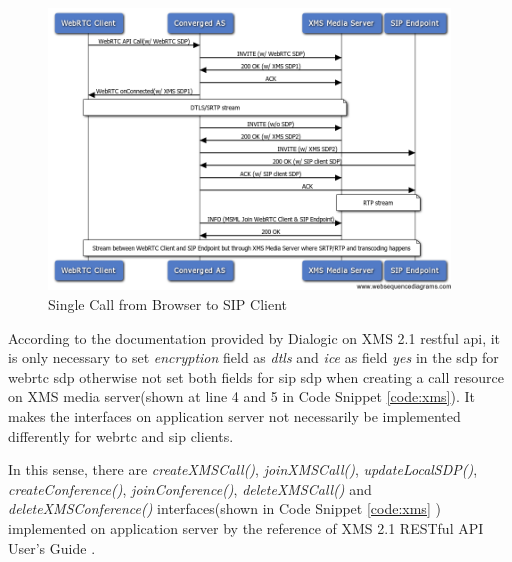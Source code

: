 \begin{figure}
	\centering
    	\includegraphics[width=0.95\textwidth,natwidth=610,natheight=642]{figs/chrome2xms.png}
  	\caption{Single Call from Browser to SIP Client}
  	\label{fig:chrome2xms}
\end{figure}

\par According to the documentation provided by Dialogic on XMS 2.1 \gls{rest}ful \gls{api}\cite{doc:xms_webapi}, it is only necessary to set \textit{encryption} field as \textit{dtls} and \textit{ice} as field \textit{yes} in the \gls{sdp} for \gls{webrtc} \gls{sdp} otherwise not set both fields for \gls{sip} \gls{sdp} when creating a call resource on XMS media server(shown at line 4 and 5 in Code Snippet \ref{code:xms}). It makes the interfaces on application server not necessarily be implemented differently for \gls{webrtc} and \gls{sip} clients.

\par In this sense, there are \textit{createXMSCall()}, \textit{joinXMSCall()}, \textit{updateLocalSDP()}, \textit{createConference()}, \textit{joinConference()}, \textit{deleteXMSCall()} and \textit{deleteXMSConference()} interfaces(shown in Code Snippet \ref{code:xms} ) implemented on application server by the reference of XMS 2.1 RESTful API User's Guide \cite{doc:xms_webapi}.

